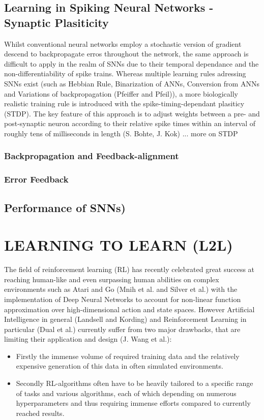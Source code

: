 \documentclass[letterpaper, 10 pt, conference]{ieeeconf}  %
\begin{document}
\subsection{Learning in Spiking Neural Networks - Synaptic Plasiticity}

Whilst conventional neural networks employ a stochastic version of gradient descend to backpropagate erros throughout the network, the same approach
is difficult to apply in the realm of SNNs due to their temporal dependance and the non-differentiability of spike trains. Whereas multiple learning
rules adressing SNNs exist (such as Hebbian Rule, Binarization of ANNs, Conversion from ANNs and Variations of backpropagation (Pfeiffer and Pfeil)), a more 
biologically realistic training rule is introduced with the spike-timing-dependant plasiticy (STDP). The key feature of this approach is 
to adjust weights between a pre- and post-synaptic neuron according to their relative spike times within an interval of roughly tens of 
milliseconds in length (S. Bohte, J. Kok)
... more on STDP 

\subsubsection{Backpropagation and Feedback-alignment}


\subsubsection{Error Feedback}

\subsection{Performance of SNNs)}

\section{LEARNING TO LEARN (L2L)}

The field of reinforcement learning (RL) has recently celebrated great success at reaching human-like and even surpassing human abilities on
complex environments such as Atari and Go (Mnih et al. and Silver et al.) with the implementation of Deep Neural Networks to 
account for non-linear function approximation over high-dimensional action and state spaces. However Artificial Intelligence in general 
(Landsell and Kording) and Reinforcement Learning in particular (Dual et al.) currently suffer from two major drawbacks, 
that are limiting their application and design (J. Wang et al.): 
\begin{itemize}
        \item Firstly the immense volume of required training data and the relatively expensive generation of this data in often simulated
        environments.
        \item Secondly RL-algorithms often have to be heavily tailored to a specific range of tasks and various algorithms, each of which
        depending on numerous hyperparameters and thus requiring immense efforts compared to currently reached results.
\end{itemize}        
\end{document}
